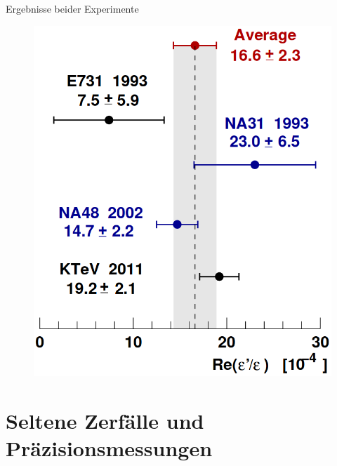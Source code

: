 \documentclass[aspectratio=1610, professionalfonts, 9pt, t]{beamer}
\begin{document}
  \begin{frame}{Ergebnisse beider Experimente}
    \begin{figure}
      \includegraphics[height=0.9\textheight]{Images/ktevna48.png}
    \end{figure}
  \end{frame}


\section{Seltene Zerfälle und Präzisionsmessungen}
\end{document}
